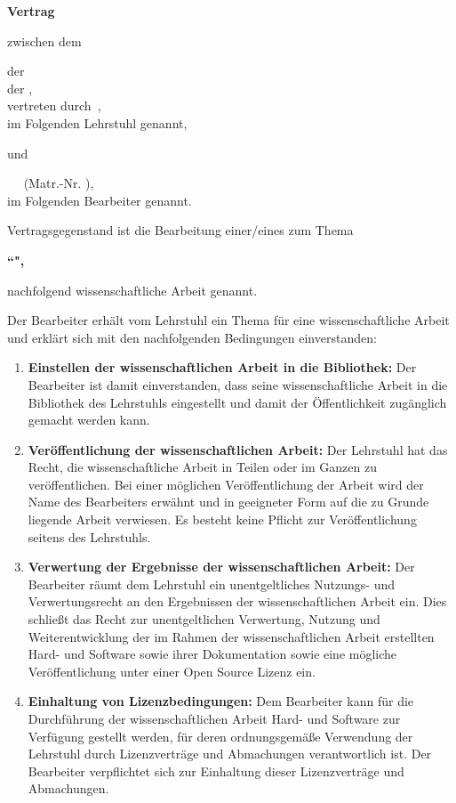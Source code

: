 \documentclass[german,11pt,a4paper]{netforms}
\begin{document}
\netformheader

\textbf{\LARGE Vertrag}

\vskip2.5mm
zwischen dem

\vskip2mm
\hfill\begin{minipage}{.9\textwidth}
\NETname{} der\\
\INname{} der \TUMname,\\
vertreten durch\
\NEThead,\\
im Folgenden \glqq{}Lehrstuhl\grqq{} genannt,
\end{minipage}

\vskip2mm
und

\vskip2mm
\hfill\begin{minipage}{.9\textwidth}
\theanrede\ \thevorname\
\textbf{\thenachname} (Matr.-Nr. \thematrikel),\\
im Folgenden \glqq{}Bearbeiter\grqq{} genannt.
\end{minipage}

\vskip5mm
Vertragsgegenstand ist die Bearbeitung einer/eines \textbf{\thetype} zum Thema
\begin{center}
	\bfseries ``\thetitleenglish",
\end{center}
nachfolgend \glqq{}wissenschaftliche Arbeit\grqq{} genannt.

\vskip5mm
Der Bearbeiter erh\"alt vom Lehrstuhl ein Thema f\"ur eine wissenschaftliche
Arbeit und erkl\"art sich mit den nachfolgenden Bedingungen einverstanden:
\begin{enumerate}
	\item \textbf{Einstellen der wissenschaftlichen Arbeit in die Bibliothek:}
	Der Bearbeiter ist damit einverstanden, dass seine wissenschaftliche Arbeit
	in die Bibliothek des Lehrstuhls eingestellt und damit der \"Offentlichkeit
	zug\"anglich gemacht werden kann.
	\item \textbf{Ver\"offentlichung der wissenschaftlichen Arbeit:}
	Der Lehrstuhl hat das Recht, die wissenschaftliche Arbeit in Teilen oder im
	Ganzen zu ver\"offentlichen.
	Bei einer m\"oglichen Ver\"offentlichung der Arbeit wird der Name des
	Bearbeiters erw\"ahnt und in geeigneter Form auf die zu Grunde liegende
	Arbeit verwiesen.
	Es besteht keine Pflicht zur Ver\"offentlichung seitens des Lehrstuhls.
	\item \textbf{Verwertung der Ergebnisse der wissenschaftlichen Arbeit:}
	Der Bearbeiter r\"aumt dem Lehrstuhl ein unentgeltliches Nutzungs- und
	Verwertungsrecht an den Ergebnissen der wissenschaftlichen Arbeit ein.
	Dies schlie\ss{}t das Recht zur unentgeltlichen Verwertung, Nutzung und
	Weiterentwicklung der im Rahmen der wissenschaftlichen Arbeit erstellten
	Hard- und Software sowie ihrer Dokumentation sowie eine m\"ogliche
	Ver\"offentlichung unter einer Open Source Lizenz ein.
	\item \textbf{Einhaltung von Lizenzbedingungen:}
	Dem Bearbeiter kann f\"ur die Durchf\"uhrung der wissenschaftlichen Arbeit
	Hard- und Software zur Verf\"ugung gestellt werden, f\"ur deren
	ordnungsgem\"a\ss{}e Verwendung der Lehrstuhl durch Lizenzvertr\"age und
	Abmachungen verantwortlich ist.
	Der Bearbeiter verpflichtet sich zur Einhaltung dieser Lizenzvertr\"age und
	Abmachungen.
\end{enumerate}
\end{document}
